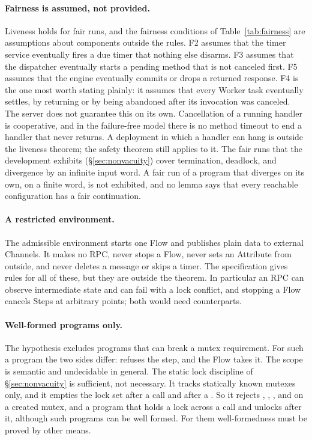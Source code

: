 \paragraph{Fairness is assumed, not provided.}
Liveness holds for fair runs, and the fairness conditions of
Table~\ref{tab:fairness} are assumptions about components outside the
rules. F2 assumes that the timer service eventually fires a due timer that
nothing else disarms. F3 assumes that the dispatcher eventually starts a
pending method that is not canceled first. F5 assumes
that the engine eventually commits or drops a returned response. F4 is the
one most worth stating plainly: it assumes that every Worker task
eventually settles, by returning or by being abandoned after its invocation
was canceled. The server does not guarantee this on its own. Cancellation
of a running handler is cooperative, and in the failure-free model there is
no method timeout to end a handler that never returns. A deployment in
which a handler can hang is outside the liveness theorem; the safety
theorem still applies to it. The fair runs that the development exhibits
(\S\ref{sec:nonvacuity}) cover termination, deadlock, and divergence by an
infinite input word. A fair run of a program that diverges on its own, on a
finite word, is not exhibited, and no lemma says that every reachable
configuration has a fair continuation.

\paragraph{A restricted environment.}
The admissible environment starts one Flow and publishes plain data to
external Channels. It makes no RPC, never stops a Flow, never sets an
Attribute from outside, and never deletes a message or skips a timer. The
specification gives rules for all of these, but they are outside the
theorem. In particular an RPC can observe intermediate state and can fail
with a lock conflict, and stopping a Flow cancels Steps at arbitrary
points; both would need \Lang{} counterparts.

\paragraph{Well-formed programs only.}
The hypothesis  excludes programs that can break
a mutex requirement. For such a program the two sides differ: \Lang{}
refuses the step, and the Flow takes it. The scope is semantic and
undecidable in general. The static lock discipline of
\S\ref{sec:nonvacuity} is sufficient, not necessary. It tracks statically
known mutexes only, and it empties the lock set after a call and after a
. So it rejects , , , and
 on a created mutex, and a program that holds a lock across a
call and unlocks after it, although such programs can be well formed. For
them well-formedness must be proved by other means.

